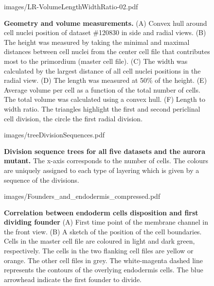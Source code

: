 \documentclass[11pt,a4paper, final]{article}
\begin{document}
%
\clearpage
%
\begin{figure}[htbp]
	\begin{center}
	\begin{overpic}[width=1.\linewidth]{images/LR-VolumeLengthWidthRatio-02.pdf}
	\end{overpic}
\caption[Geometry and volume measurements.]
{{\bf Geometry and volume measurements.} (A) Convex hull around cell nuclei position of dataset \#120830 in side and radial views. (B) The height was measured by taking the minimal and maximal distances between cell nuclei from the center cell file that contributes most to the primordium (master cell file). (C) The width was calculated by the largest distance of all cell nuclei positions in the radial view. (D) The length was measured at 50\% of the height. (E) Average volume per cell as a function of the total number of cells. The total volume was calculated using a convex hull. (F) Length to width ratio. The triangles highlight the first and second periclinal cell division, the circle the first radial division.}
	\label{fig:VLWR}
	\end{center}
\end{figure}
%
\clearpage
%
\begin{figure}[htbp]
	\begin{center}
		\begin{overpic}[width=1.\linewidth]{images/treeDivisionSequences.pdf}
		\end{overpic}
\caption[Division sequence trees for all five datasets and the aurora mutant.]
{
{\bf Division sequence trees for all five datasets and the aurora mutant.} The x-axis corresponds to the number of cells. The colours are uniquely assigned to each type of layering which is given by a sequence of the divisions.}
	\label{fig:treeDivisionSequences}
	\end{center}
\end{figure}
%
\clearpage
%
\begin{figure}[htbp]
	\begin{center}
	\begin{overpic}[width=0.5\linewidth]{images/Founders_and_endodermis_compressed.pdf}
	\end{overpic}
\caption[Correlation between endoderm cells disposition and first dividing founder.]
{{\bf Correlation between endoderm cells disposition and first dividing founder} (A) First time point of the membrane channel in the front view. (B) A sketch of the position of the cell boundaries. Cells in the master cell file are coloured in light and dark green, respectively. The cells in the two flanking cell files are yellow or orange. The other cell files in grey. The white-magenta dashed line represents the contours of the overlying endodermis cells. The blue arrowhead indicate the first founder to divide.}
	\label{fig:foundersendo}
	\end{center}
\end{figure}
%
\clearpage
\end{document}
